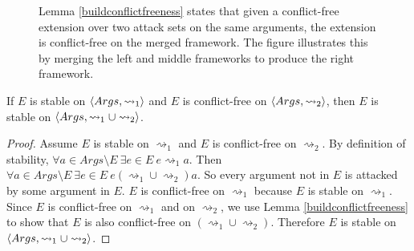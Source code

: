 \begin{figure}[H]
	\begin{center}
		\hspace{1cm}
		\hspace{1cm}
	\end{center}
	\caption{Lemma \ref{buildconflictfreeness} states that given a conflict-free extension over two attack sets on the same arguments, the extension is conflict-free on the merged framework. The figure illustrates this by merging the left and middle frameworks to produce the right framework.}
\end{figure}

\begin{lemma}
	\label{buildstability}
	If $E$ is stable on $\langle{Args},{\rightsquigarrow_1}\rangle$ and $E$ is conflict-free on $\langle{Args},{\rightsquigarrow_2}\rangle$, then $E$ is stable on $\langle{Args},{\rightsquigarrow_1\cup\rightsquigarrow_2}\rangle$.
	
	\begin{proof}
		Assume $E$ is stable on $\rightsquigarrow_1$ and $E$ is conflict-free on $\rightsquigarrow_2$. By definition of stability, $\forall a\in Args\setminus E\ \exists e\in E\ e\rightsquigarrow_1 a$. Then $\forall a\in Args\setminus E\ \exists e\in E\ e(\rightsquigarrow_1\cup\rightsquigarrow_2)a$. So every argument not in $E$ is attacked by some argument in $E$. $E$ is conflict-free on $\rightsquigarrow_1$ because $E$ is stable on $\rightsquigarrow_1$. Since $E$ is conflict-free on $\rightsquigarrow_1$ and on $\rightsquigarrow_2$, we use Lemma \ref{buildconflictfreeness} to show that $E$ is also conflict-free on $(\rightsquigarrow_1\cup\rightsquigarrow_2)$. Therefore $E$ is stable on $\langle{Args},{\rightsquigarrow_1\cup\rightsquigarrow_2}\rangle$.
	\end{proof}
\end{lemma}

